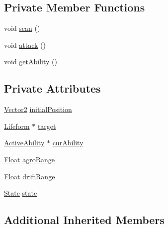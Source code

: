 \subsection*{Private Member Functions}
\begin{DoxyCompactItemize}
\item 
void \hyperlink{classZeta_1_1AggressiveBehaviour_a2e8b01db56c557cefdcd72d94610ffca}{scan} ()
\item 
void \hyperlink{classZeta_1_1AggressiveBehaviour_a54bc15050dd6470acd003d2d33b0b99f}{attack} ()
\item 
void \hyperlink{classZeta_1_1AggressiveBehaviour_a5db91c7bfcf560b936fce836ef02ca1d}{get\+Ability} ()
\end{DoxyCompactItemize}
\subsection*{Private Attributes}
\begin{DoxyCompactItemize}
\item 
\hyperlink{classZeta_1_1Vector2}{Vector2} \hyperlink{classZeta_1_1AggressiveBehaviour_a5301708e316129eb682436d7b8a09cac}{initial\+Position}
\item 
\hyperlink{classZeta_1_1Lifeform}{Lifeform} $\ast$ \hyperlink{classZeta_1_1AggressiveBehaviour_a7f1e06e7f51216cb7d9bb8ade9d79a47}{target}
\item 
\hyperlink{classZeta_1_1ActiveAbility}{Active\+Ability} $\ast$ \hyperlink{classZeta_1_1AggressiveBehaviour_affc1dc9f79144d64b9f627458442b7c5}{cur\+Ability}
\item 
\hyperlink{namespaceZeta_a1e0a1265f9b3bd3075fb0fabd39088ba}{Float} \hyperlink{classZeta_1_1AggressiveBehaviour_a46ae846d179081d36af1daaeb21c0a55}{agro\+Range}
\item 
\hyperlink{namespaceZeta_a1e0a1265f9b3bd3075fb0fabd39088ba}{Float} \hyperlink{classZeta_1_1AggressiveBehaviour_af3f8203e1075c28d5141810ac07f1f5e}{drift\+Range}
\item 
\hyperlink{classZeta_1_1AggressiveBehaviour_a768e2c9d0969879f4980d72220e11fbe}{State} \hyperlink{classZeta_1_1AggressiveBehaviour_ae0a924de0719f042bcb2f9def9a61e2b}{state}
\end{DoxyCompactItemize}
\subsection*{Additional Inherited Members}


